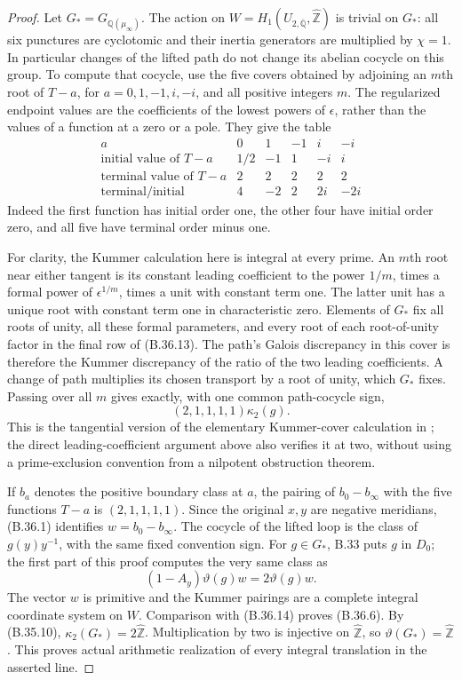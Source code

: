 \begin{proof}
Let $G_*=G_{\mathbb Q(\mu_\infty)}$.  The action on
$W=H_1(U_{2,\overline{\mathbb Q}},\widehat{\mathbb Z})$
is trivial on $G_*$: all six punctures are cyclotomic and
their inertia generators are multiplied by $\chi=1$.
In particular changes of the lifted path do not change its
abelian cocycle on this group.
To compute that cocycle, use the five covers obtained by
adjoining an $m$th root of $T-a$, for
$a=0,1,-1,i,-i$, and all positive integers $m$.
The regularized endpoint values are the coefficients of
the lowest powers of $\epsilon$, rather than the values
of a function at a zero or a pole.  They give the table
\[
\begin{array}{c|ccccc}
 a&0&1&-1&i&-i\\\hline
 \text{initial value of }T-a&1/2&-1&1&-i&i\\
 \text{terminal value of }T-a&2&2&2&2&2\\
 \text{terminal/initial}&4&-2&2&2i&-2i
\end{array}                                             \tag{B.36.13}
\]
Indeed the first function has initial order one, the other
four have initial order zero, and all five have terminal
order minus one.

For clarity, the Kummer calculation here is integral at
every prime.  An $m$th root near either tangent is its
constant leading coefficient to the power $1/m$, times
a formal power of $\epsilon^{1/m}$, times a unit with
constant term one.  The latter unit has a unique root with
constant term one in characteristic zero.  Elements of
$G_*$ fix all roots of unity, all these formal parameters,
and every root of each root-of-unity factor in the final
row of (B.36.13).  The path's Galois discrepancy in this
cover is therefore the Kummer discrepancy of the ratio
of the two leading coefficients.  A change of path
multiplies its chosen transport by a root of unity, which
$G_*$ fixes.  Passing over all $m$ gives exactly, with
one common path-cocycle sign,
\[
                  (2,1,1,1,1)\kappa_2(g).              \tag{B.36.14}
\]
This is the tangential version of the elementary Kummer-cover
calculation in \citet[\S3.10 and Lemma 3.16]{FA_Wickelgren2012};
the direct leading-coefficient argument above also verifies
it at two, without using a prime-exclusion convention from
a nilpotent obstruction theorem.

If $b_a$ denotes the positive boundary class at $a$, the
pairing of $b_0-b_\infty$ with the five functions $T-a$
is $(2,1,1,1,1)$.  Since the original $x,y$ are negative
meridians, (B.36.1) identifies
$w=b_0-b_\infty$.  The cocycle of the lifted loop is the
class of $g(y)y^{-1}$, with the same fixed convention sign.
For $g\in G_*$, B.33 puts $g$ in $D_0$; the first part
of this proof computes the very same class as
\[
             (1-A_y)\vartheta(g)w=2\vartheta(g)w.
\]
The vector $w$ is primitive and the Kummer pairings are a
complete integral coordinate system on $W$.  Comparison
with (B.36.14) proves (B.36.6).
By (B.35.10), $\kappa_2(G_*)=2\widehat{\mathbb Z}$.
Multiplication by two is injective on $\widehat{\mathbb Z}$,
so $\vartheta(G_*)=\widehat{\mathbb Z}$.
This proves actual arithmetic realization of every integral
translation in the asserted line.


\end{proof}
